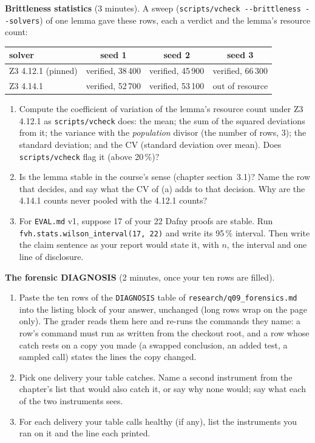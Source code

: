 \documentclass[11pt]{article}
\begin{document}
\begin{problem}\label{prob:B2}
\textbf{Brittleness statistics} (3 minutes). A sweep
(\texttt{scripts/vcheck -{}-brittleness -{}-solvers}) of one lemma gave these rows,
each a verdict and the lemma's resource count:
\begin{center}
\begin{tabular}{lccc}
solver & seed 1 & seed 2 & seed 3 \\ \hline
Z3 4.12.1 (pinned) & verified, 38\,400 & verified, 45\,900 & verified, 66\,300 \\
Z3 4.14.1 & verified, 52\,700 & verified, 53\,100 & out of resource
\end{tabular}
\end{center}
\begin{enumerate}
\item[(a)] Compute the coefficient of variation of the lemma's resource count
  under Z3 4.12.1 as \texttt{scripts/vcheck} does: the mean; the sum of the
  squared deviations from it; the variance with the \emph{population} divisor
  (the number of rows, 3); the standard deviation; and the CV (standard
  deviation over mean). Does \texttt{scripts/vcheck} flag it (above 20\,\%)?
\item[(b)] Is the lemma stable in the course's sense (chapter section~3.1)?
  Name the row that decides, and say what the CV of (a) adds to that
  decision. Why are the 4.14.1 counts never pooled with the 4.12.1 counts?
\item[(c)] For \texttt{EVAL.md} v1, suppose 17 of your 22 Dafny proofs are
  stable. Run \texttt{fvh.stats.wilson\_interval(17, 22)} and write its 95\,\%
  interval. Then write the claim sentence as your report would state it, with
  $n$, the interval and one line of disclosure.
\end{enumerate}
\end{problem}

\begin{problem}[concept]\label{prob:B3}
\textbf{The forensic DIAGNOSIS} (2 minutes, once your ten rows are filled).
\begin{enumerate}
\item[(a)] Paste the ten rows of the \texttt{DIAGNOSIS} table of
  \texttt{research/q09\_forensics.md} into the listing block of your
  answer, unchanged (long rows wrap on the page only). The grader reads
  them here and re-runs the commands they name: a row's command must run
  as written from the checkout root, and a row whose catch rests on a copy you made (a swapped conclusion, an added test, a
  sampled call) states the lines the copy changed.
\item[(b)] Pick one delivery your table catches. Name a second instrument from
  the chapter's list that would also catch it, or say why none would; say what
  each of the two instruments sees.
\item[(c)] For each delivery your table calls healthy (if any), list the
  instruments you ran on it and the line each printed.
\end{enumerate}
\end{problem}
\end{document}
